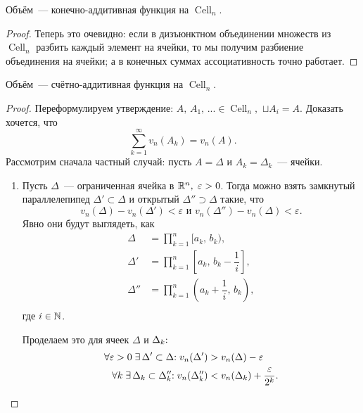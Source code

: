 \documentclass{notes}
\DeclareMathOperator{\Cell}{Cell}
\begin{document}
	\begin{thm}
		Объём~--- конечно-аддитивная функция на $\Cell_n$.
		\begin{proof}
			Теперь это очевидно: если в дизъюнктном объединении множеств из $\Cell_n$ разбить каждый элемент на ячейки, то мы получим разбиение объединения на ячейки; а в конечных суммах ассоциативность точно работает.
		\end{proof}
	\end{thm}

	\begin{thm}
		Объём~--- счётно-аддитивная функция на $\Cell_n$.
		\begin{proof}
			Переформулируем утверждение: $A, \, A_1, \, ... \in \Cell_n,$ $\sqcup A_i = A$. Доказать хочется, что
			\[
				\sum\limits_{k = 1}^{\infty} v_n(A_k) = v_n(A).
			\]
			Рассмотрим сначала частный случай: пусть $A = \Delta$ и $A_k = \Delta_k$~--- ячейки.

			\begin{enumerate}
				\item 
				Пусть $\Delta$~--- ограниченная ячейка в $\mathbb{R}^n, \; \varepsilon > 0$. Тогда можно взять замкнутый параллелепипед $\Delta' \subset \Delta$ и открытый $\Delta'' \supset \Delta$ такие, что
				\[
					v_n(\Delta) - v_n(\Delta') < \varepsilon \text{ и } v_n(\Delta'') - v_n(\Delta) < \varepsilon. 
				\]
				Явно они будут выглядеть, как
				\begin{align*}
					\Delta &= \prod_{k = 1}^n [a_k, \, b_k), \\
					\Delta' &= \prod_{k = 1}^n \left[a_k, \, b_k - \dfrac{1}{i}\right], \\
					\Delta'' &= \prod_{k = 1}^n \left(a_k + \dfrac{1}{i}, \, b_k\right), \\
				\end{align*}
				где $i \in \mathbb{N}$.

				Проделаем это для ячеек $\Delta$ и $\Delta_k\text{\text{:}}$
				\begin{align*}
					\forall \varepsilon > 0 \; \exists \, \Delta' \subset \Delta \text{\text{:}} \; v_n(\Delta') &> v_n(\Delta) - \varepsilon \\ 
					\forall k \; \exists \, \Delta_k \subset \Delta_k'' \text{\text{:}} \; v_n(\Delta_k'') &< v_n(\Delta_k) + \dfrac{\varepsilon}{2^k}.
				\end{align*}


\end{enumerate}
\end{proof}
\end{thm}
\end{document}
